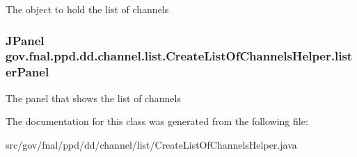 The object to hold the list of channels \hypertarget{classgov_1_1fnal_1_1ppd_1_1dd_1_1channel_1_1list_1_1CreateListOfChannelsHelper_af7f5d450eff8fc117d70ddd5e0621308}{
\subsubsection[{lister\-Panel}]{\setlength{\rightskip}{0pt plus 5cm}J\-Panel gov.\-fnal.\-ppd.\-dd.\-channel.\-list.\-Create\-List\-Of\-Channels\-Helper.\-lister\-Panel}}\label{classgov_1_1fnal_1_1ppd_1_1dd_1_1channel_1_1list_1_1CreateListOfChannelsHelper_af7f5d450eff8fc117d70ddd5e0621308}
The panel that shows the list of channels 

The documentation for this class was generated from the following file\-:\begin{DoxyCompactItemize}
\item 
src/gov/fnal/ppd/dd/channel/list/Create\-List\-Of\-Channels\-Helper.\-java\end{DoxyCompactItemize}
